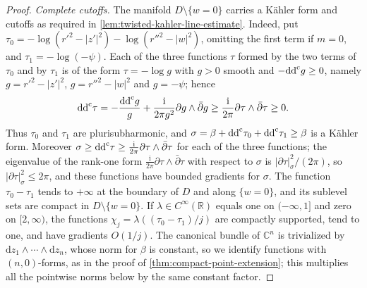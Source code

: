 \begin{proof}
\emph{Complete cutoffs.} The manifold $D\setminus\{w=0\}$ carries a K\"ahler form and cutoffs as required in \cref{lem:twisted-kahler-line-estimate}. Indeed, put $\tau_0=-\log(r'^2-|z'|^2)-\log(r''^2-|w|^2)$, omitting the first term if $m=0$, and $\tau_1=-\log(-\psi)$. Each of the three functions $\tau$ formed by the two terms of $\tau_0$ and by $\tau_1$ is of the form $\tau=-\log g$ with $g>0$ smooth and $-\mathrm{dd}^{\mathrm{c}} g\geq0$, namely $g=r'^2-|z'|^2$, $g=r''^2-|w|^2$ and $g=-\psi$; hence
\[
 \mathrm{dd}^{\mathrm{c}}\tau=-\frac{\mathrm{dd}^{\mathrm{c}} g}{g}+\frac{\mathrm i}{2\pi g^2}\partial g\wedge\bar\partial g\geq\frac{\mathrm i}{2\pi}\partial\tau\wedge\bar\partial\tau\geq0.
\]
Thus $\tau_0$ and $\tau_1$ are plurisubharmonic, and $\sigma=\beta+\mathrm{dd}^{\mathrm{c}}\tau_0+\mathrm{dd}^{\mathrm{c}}\tau_1\geq\beta$ is a K\"ahler form. Moreover $\sigma\geq\mathrm{dd}^{\mathrm{c}}\tau\geq\frac{\mathrm i}{2\pi}\partial\tau\wedge\bar\partial\tau$ for each of the three functions; the eigenvalue of the rank-one form $\frac{\mathrm i}{2\pi}\partial\tau\wedge\bar\partial\tau$ with respect to $\sigma$ is $|\partial\tau|_\sigma^2/(2\pi)$, so $|\partial\tau|_\sigma^2\leq2\pi$, and these functions have bounded gradients for $\sigma$. The function $\tau_0-\tau_1$ tends to $+\infty$ at the boundary of $D$ and along $\{w=0\}$, and its sublevel sets are compact in $D\setminus\{w=0\}$. If $\lambda\in C^\infty(\mathbb R)$ equals one on $(-\infty,1]$ and zero on $[2,\infty)$, the functions $\chi_j=\lambda((\tau_0-\tau_1)/j)$ are compactly supported, tend to one, and have gradients $O(1/j)$. The canonical bundle of $\mathbb C^n$ is trivialized by $\mathrm dz_1\wedge\cdots\wedge\mathrm dz_n$, whose norm for $\beta$ is constant, so we identify functions with $(n,0)$-forms, as in the proof of \cref{thm:compact-point-extension}; this multiplies all the pointwise norms below by the same constant factor.


\end{proof}
